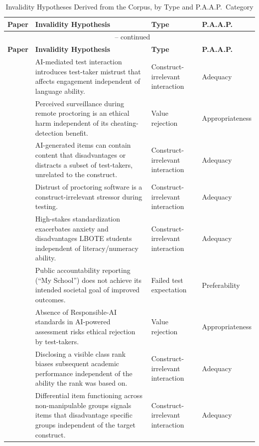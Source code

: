 \documentclass[11pt]{article}
\begin{document}
{\small
\begin{longtable}{p{2.6cm} p{8.6cm} p{2.6cm} p{1.7cm}}
\caption{Invalidity Hypotheses Derived from the Corpus, by Type and P.A.A.P.\ Category} \label{tab:invalidity} \\
\toprule
\textbf{Paper} & \textbf{Invalidity Hypothesis} & \textbf{Type} & \textbf{P.A.A.P.} \\
\midrule
\endfirsthead
\multicolumn{4}{c}{\tablename\ \thetable{} -- continued} \\
\toprule
\textbf{Paper} & \textbf{Invalidity Hypothesis} & \textbf{Type} & \textbf{P.A.A.P.} \\
\midrule
\endhead
\bottomrule
\endfoot
\citet{zhang2023testtakers} & AI-mediated test interaction introduces test-taker mistrust that affects engagement independent of language ability. & Construct-irrelevant interaction & Adequacy \\
\citet{mukherjee2024proctoring} & Perceived surveillance during remote proctoring is an ethical harm independent of its cheating-detection benefit. & Value rejection & Appropriateness \\
\citet{stowe2024fairness} & AI-generated items can contain content that disadvantages or distracts a subset of test-takers, unrelated to the construct. & Construct-irrelevant interaction & Adequacy \\
\citet{balash2021examiners} & Distrust of proctoring software is a construct-irrelevant stressor during testing. & Construct-irrelevant interaction & Adequacy \\
\citet{zhangw2024naplan} & High-stakes standardization exacerbates anxiety and disadvantages LBOTE students independent of literacy/numeracy ability. & Construct-irrelevant interaction & Adequacy \\
\citet{zhangw2024naplan} & Public accountability reporting (``My School'') does not achieve its intended societal goal of improved outcomes. & Failed test expectation & Preferability \\
\citet{burstein2024responsible} & Absence of Responsible-AI standards in AI-powered assessment risks ethical rejection by test-takers. & Value rejection & Appropriateness \\
\citet{ladant2023saliency} & Disclosing a visible class rank biases subsequent academic performance independent of the ability the rank was based on. & Construct-irrelevant interaction & Adequacy \\
\citet{suk2026unfairness} & Differential item functioning across non-manipulable groups signals items that disadvantage specific groups independent of the target construct. & Construct-irrelevant interaction & Adequacy \\

\end{longtable}}
\end{document}
